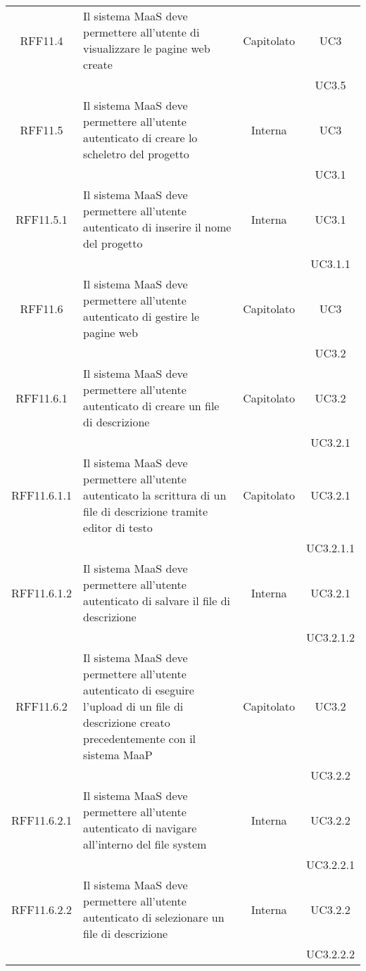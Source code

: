 \begin{longtable}{|c|p{6cm}|c|c|}
\midrule
RFF11.4
& Il sistema MaaS deve permettere all'utente di visualizzare le pagine web create
& Capitolato
& UC3\\
& & & UC3.5\\

\midrule
RFF11.5
& Il sistema MaaS deve permettere all'utente autenticato di creare lo scheletro del progetto
& Interna
& UC3\\
& & & UC3.1\\

\midrule
RFF11.5.1
& Il sistema MaaS deve permettere all'utente autenticato di inserire il nome del progetto
& Interna
& UC3.1\\
& & & UC3.1.1\\

\midrule
RFF11.6
& Il sistema MaaS deve permettere all'utente autenticato di gestire le pagine web
& Capitolato
& UC3\\
& & & UC3.2\\

\midrule
RFF11.6.1
& Il sistema MaaS deve permettere all'utente autenticato di creare un file di descrizione
& Capitolato
& UC3.2\\
& & & UC3.2.1\\

\midrule
RFF11.6.1.1
& Il sistema MaaS deve permettere all'utente autenticato la scrittura di un file di descrizione tramite editor di testo
& Capitolato
& UC3.2.1\\
& & & UC3.2.1.1\\

\midrule
RFF11.6.1.2
& Il sistema MaaS deve permettere all'utente autenticato di salvare il file di descrizione
& Interna
& UC3.2.1\\
& & & UC3.2.1.2\\


\midrule
RFF11.6.2
& Il sistema MaaS deve permettere all'utente autenticato di eseguire l'upload di un file di descrizione creato precedentemente con il sistema MaaP
& Capitolato
& UC3.2\\
& & & UC3.2.2\\

\midrule
RFF11.6.2.1
& Il sistema MaaS deve permettere all'utente autenticato di navigare all'interno del file system
& Interna
& UC3.2.2\\
& & & UC3.2.2.1\\

\midrule
RFF11.6.2.2
& Il sistema MaaS deve permettere all'utente autenticato di selezionare un file di descrizione
& Interna
& UC3.2.2\\
& & & UC3.2.2.2\\


\end{longtable}
